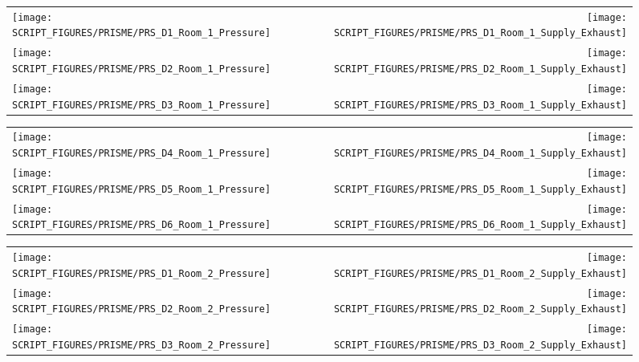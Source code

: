 \begin{figure}[!ht]
\begin{tabular*}{\textwidth}{l@{\extracolsep{\fill}}r}
\texttt{[image: SCRIPT\_FIGURES/PRISME/PRS\_D1\_Room\_1\_Pressure]} &
\texttt{[image: SCRIPT\_FIGURES/PRISME/PRS\_D1\_Room\_1\_Supply\_Exhaust]} \\
\texttt{[image: SCRIPT\_FIGURES/PRISME/PRS\_D2\_Room\_1\_Pressure]} &
\texttt{[image: SCRIPT\_FIGURES/PRISME/PRS\_D2\_Room\_1\_Supply\_Exhaust]} \\
\texttt{[image: SCRIPT\_FIGURES/PRISME/PRS\_D3\_Room\_1\_Pressure]} &
\texttt{[image: SCRIPT\_FIGURES/PRISME/PRS\_D3\_Room\_1\_Supply\_Exhaust]} 
\end{tabular*}
\label{PRISME_Room_1_Pressure_1-3}
\end{figure}

\begin{figure}[p]
\begin{tabular*}{\textwidth}{l@{\extracolsep{\fill}}r}
\texttt{[image: SCRIPT\_FIGURES/PRISME/PRS\_D4\_Room\_1\_Pressure]} &
\texttt{[image: SCRIPT\_FIGURES/PRISME/PRS\_D4\_Room\_1\_Supply\_Exhaust]} \\
\texttt{[image: SCRIPT\_FIGURES/PRISME/PRS\_D5\_Room\_1\_Pressure]} &
\texttt{[image: SCRIPT\_FIGURES/PRISME/PRS\_D5\_Room\_1\_Supply\_Exhaust]} \\
\texttt{[image: SCRIPT\_FIGURES/PRISME/PRS\_D6\_Room\_1\_Pressure]} &
\texttt{[image: SCRIPT\_FIGURES/PRISME/PRS\_D6\_Room\_1\_Supply\_Exhaust]}
\end{tabular*}
\label{PRISME_Room_1_Pressure_4-6}
\end{figure}

\begin{figure}[p]
\begin{tabular*}{\textwidth}{l@{\extracolsep{\fill}}r}
\texttt{[image: SCRIPT\_FIGURES/PRISME/PRS\_D1\_Room\_2\_Pressure]} &
\texttt{[image: SCRIPT\_FIGURES/PRISME/PRS\_D1\_Room\_2\_Supply\_Exhaust]} \\
\texttt{[image: SCRIPT\_FIGURES/PRISME/PRS\_D2\_Room\_2\_Pressure]} &
\texttt{[image: SCRIPT\_FIGURES/PRISME/PRS\_D2\_Room\_2\_Supply\_Exhaust]} \\
\texttt{[image: SCRIPT\_FIGURES/PRISME/PRS\_D3\_Room\_2\_Pressure]} &
\texttt{[image: SCRIPT\_FIGURES/PRISME/PRS\_D3\_Room\_2\_Supply\_Exhaust]}
\end{tabular*}
\label{PRISME_Room_2_Pressure_1-3}
\end{figure}

